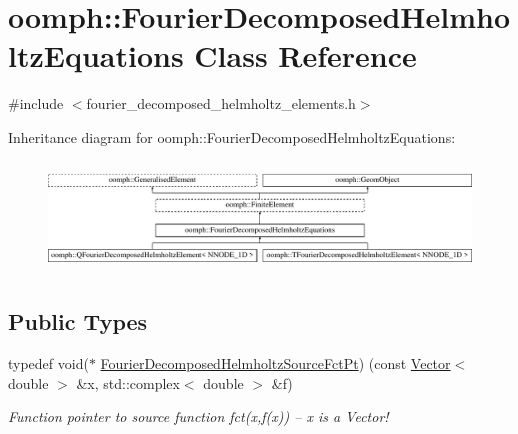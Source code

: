 \hypertarget{classoomph_1_1FourierDecomposedHelmholtzEquations}{}\section{oomph\+:\+:Fourier\+Decomposed\+Helmholtz\+Equations Class Reference}
\label{classoomph_1_1FourierDecomposedHelmholtzEquations}


{\ttfamily \#include $<$fourier\+\_\+decomposed\+\_\+helmholtz\+\_\+elements.\+h$>$}

Inheritance diagram for oomph\+:\+:Fourier\+Decomposed\+Helmholtz\+Equations\+:\begin{figure}[H]
\begin{center}
\leavevmode
\includegraphics[height=2.962963cm]{classoomph_1_1FourierDecomposedHelmholtzEquations}
\end{center}
\end{figure}
\subsection*{Public Types}
\begin{DoxyCompactItemize}
\item 
typedef void($\ast$ \hyperlink{classoomph_1_1FourierDecomposedHelmholtzEquations_a66a39c7967ffeedd994c206e2a5f0d4e}{Fourier\+Decomposed\+Helmholtz\+Source\+Fct\+Pt}) (const \hyperlink{classoomph_1_1Vector}{Vector}$<$ double $>$ \&x, std\+::complex$<$ double $>$ \&f)
\begin{DoxyCompactList}\small\item\em Function pointer to source function fct(x,f(x)) -- x is a Vector! \end{DoxyCompactList}\end{DoxyCompactItemize}
